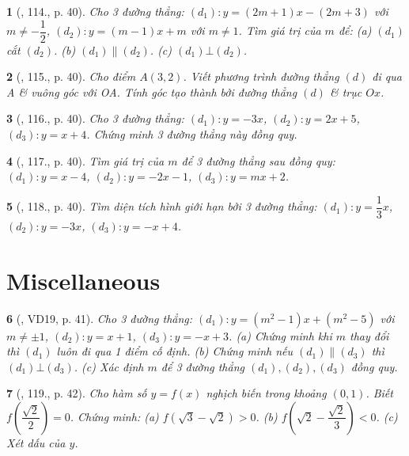 \documentclass{article}
\newtheorem{baitoan}{}
\begin{document}
\begin{baitoan}[\cite{Tuyen_Toan_9_old}, 114., p. 40]
	Cho 3 đường thẳng: $(d_1):y = (2m + 1)x - (2m + 3)$ với $m\ne-\dfrac{1}{2}$, $(d_2):y = (m - 1)x + m$ với $m\ne1$. Tìm giá trị của $m$ để: (a) $(d_1)$ cắt $(d_2)$. (b) $(d_1)\parallel(d_2)$. (c) $(d_1)\bot(d_2)$.
\end{baitoan}

\begin{baitoan}[\cite{Tuyen_Toan_9_old}, 115., p. 40]
	Cho điểm $A(3,2)$. Viết phương trình đường thẳng $(d)$ đi qua A \& vuông góc với OA. Tính góc tạo thành bởi đường thẳng $(d)$ \& trục $Ox$.
\end{baitoan}

\begin{baitoan}[\cite{Tuyen_Toan_9_old}, 116., p. 40]
	Cho 3 đường thẳng: $(d_1):y = -3x$, $(d_2):y = 2x + 5$, $(d_3):y = x + 4$. Chứng minh 3 đường thẳng này đồng quy.
\end{baitoan}

\begin{baitoan}[\cite{Tuyen_Toan_9_old}, 117., p. 40]
	Tìm giá trị của $m$ để 3 đường thẳng sau đồng quy: $(d_1):y = x - 4$, $(d_2):y = -2x - 1$, $(d_3):y = mx + 2$.
\end{baitoan}

\begin{baitoan}[\cite{Tuyen_Toan_9_old}, 118., p. 40]
	Tìm diện tích hình giới hạn bởi 3 đường thẳng: $(d_1):y = \dfrac{1}{3}x$, $(d_2):y = -3x$, $(d_3):y = -x + 4$.
\end{baitoan}


\section{Miscellaneous}

\begin{baitoan}[\cite{Tuyen_Toan_9_old}, VD19, p. 41]
	Cho 3 đường thẳng: $(d_1):y = (m^2 - 1)x + (m^2 - 5)$ với $m\ne\pm1$, $(d_2):y = x + 1$, $(d_3):y = -x + 3$. (a) Chứng minh khi $m$ thay đổi thì $(d_1)$ luôn đi qua 1 điểm cố định. (b) Chứng minh nếu $(d_1)\parallel(d_3)$ thì $(d_1)\bot(d_3)$. (c) Xác định $m$ để 3 đường thẳng $(d_1),(d_2),(d_3)$ đồng quy.
\end{baitoan}

\begin{baitoan}[\cite{Tuyen_Toan_9_old}, 119., p. 42]
	Cho hàm số $y = f(x)$ nghịch biến trong khoảng $(0,1)$. Biết $f\left(\dfrac{\sqrt{2}}{2}\right) = 0$. Chứng minh: (a) $f(\sqrt{3} - \sqrt{2}) > 0$. (b) $f\left(\sqrt{2} - \dfrac{\sqrt{2}}{3}\right) < 0$. (c) Xét dấu của $y$.
\end{baitoan}
\end{document}

